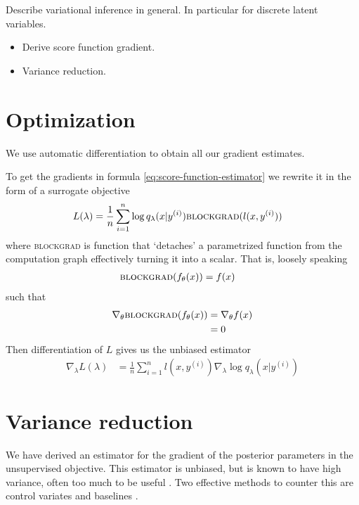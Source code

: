 Describe variational inference in general. In particular for discrete latent variables.

\begin{itemize}
  \item Derive score function gradient.
  \item Variance reduction.
\end{itemize}


\section{Optimization}
We use automatic differentiation \citep{Baydin+2017:AD} to obtain all our gradient estimates.

To get the gradients in formula \ref{eq:score-function-estimator} we rewrite it in the form of a surrogate objective \citep{Schulman+2015:surrogate}
\begin{align*}
    L(\lambda) &= \frac{1}{n}\sum_{i=1}^n \log q_{\lambda}(x|y^{(i)}) \textsc{blockgrad}(l(x,y^{(i)}))
\end{align*}
where \textsc{blockgrad} is function that `detaches' a parametrized function from the computation graph effectively turning it into a scalar. That is, loosely speaking
\begin{align*}
    \textsc{blockgrad}(f_{\theta}(x)) &= f(x)
\end{align*}
such that
\begin{align*}
    \nabla_{\theta}\textsc{blockgrad}(f_{\theta}(x)) &= \nabla_{\theta} f(x) \\
        &= 0
\end{align*}
Then differentiation of $L$ gives us the unbiased estimator
\begin{align*}
    \nabla_{\lambda} L(\lambda) &= \frac{1}{n}\sum_{i=1}^n l(x,y^{(i)}) \nabla_{\lambda} \log q_{\lambda}(x|y^{(i)})
\end{align*}

\section{Variance reduction}
We have derived an estimator for the gradient of the posterior parameters in the unsupervised objective. This estimator is unbiased, but is known to have high variance, often too much to be useful \citep{Paisley+2012:VISS}. Two effective methods to counter this are control variates and baselines \citep{Ross:2006:SIM}.

